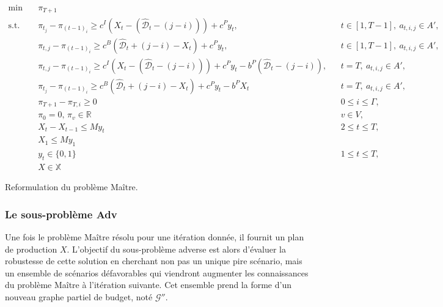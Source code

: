 \documentclass[12pt, a4paper, twoside]{report}
\numberwithin{equation}{section}
\newcommand{\adv}{\textbf{Adv} }
\begin{document}
\begin{Figure}[H]
	\begin{align}
		\min\quad & \pi_{T+1}\\
		\text{s.t.}\quad &\pi_{t_j}-\pi_{(t-1)_i} \geq c^I\left(X_t-(\hat{\mathcal{D}}_t-(j-i))\right)+c^P y_t, &&t\in[1,T-1],\ a_{t,i,j}\in A',\\
		&\pi_{t,j}-\pi_{(t-1)_i} \ge c^B\left(\hat{\mathcal{D}}_t+(j-i)-X_t\right)+c^P y_t, &&t\in[1,T-1],\ a_{t,i,j}\in A',\\
		&\pi_{t,j}-\pi_{(t-1)_i} \ge c^I\left(X_t-(\hat{\mathcal{D}}_t-(j-i))\right) +c^P y_t -b^P(\hat{\mathcal{D}}_t-(j-i)), &&t=T,\ a_{t,i,j}\in A',\\
		&\pi_{t_j}-\pi_{(t-1)_i} \geq c^B(\hat{\mathcal{D}}_t + (j-i)-X_t)+c^Py_t-b^PX_t && t=T,\ a_{t,i,j}\in A',\\
		& \pi_{T+1}-\pi_{T, i}\geq 0 && 0\leq i\leq \Gamma,\\
		&\pi_0=0,\, \pi_v\in\mathbb{R} && v\in V,\\
		&X_t-X_{t-1}\leq My_t && 2\leq t \leq T,\\
		& X_1 \leq My_1\\
		& y_t \in \{0, 1\} && 1\leq t\leq T,\\
		& X\in\mathbb{X}
	\end{align}
	
	\vspace{-0.5em}
	{   \centering
		\small Reformulation du problème Maître. \cite{portoleauTHESIS}\par
		\label{reformulation_pbr_maitre}
	}
	
	\subsubsection{Le sous-problème \adv}
	
	Une fois le problème Maître résolu pour une itération donnée, il fournit un plan de production $X$. L'objectif du sous-problème adverse est alors d'évaluer la robustesse de cette solution en cherchant non pas un unique pire scénario, mais un ensemble de scénarios défavorables qui viendront augmenter les connaissances du problème Maître à l'itération suivante. Cet ensemble prend la forme d'un nouveau graphe partiel de budget, noté $\mathcal{G}''$.


\end{Figure}
\end{document}

